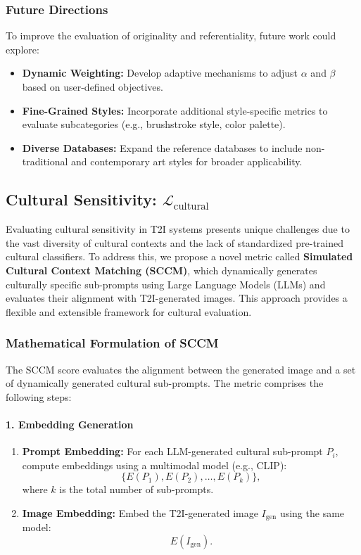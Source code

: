 \subsubsection{Future Directions}
To improve the evaluation of originality and referentiality, future work could explore:
\begin{itemize}
    \item \textbf{Dynamic Weighting:} Develop adaptive mechanisms to adjust \(\alpha\) and \(\beta\) based on user-defined objectives.
    \item \textbf{Fine-Grained Styles:} Incorporate additional style-specific metrics to evaluate subcategories (e.g., brushstroke style, color palette).
    \item \textbf{Diverse Databases:} Expand the reference databases to include non-traditional and contemporary art styles for broader applicability.
\end{itemize}


\subsection{Cultural Sensitivity: \(\mathcal{L}_{\text{cultural}}\)}
\label{subsec:cultural_sensitivity}

Evaluating cultural sensitivity in T2I systems presents unique challenges due to the vast diversity of cultural contexts and the lack of standardized pre-trained cultural classifiers. To address this, we propose a novel metric called \textbf{Simulated Cultural Context Matching (SCCM)}, which dynamically generates culturally specific sub-prompts using Large Language Models (LLMs) and evaluates their alignment with T2I-generated images. This approach provides a flexible and extensible framework for cultural evaluation.


\subsubsection{Mathematical Formulation of SCCM}
The SCCM score evaluates the alignment between the generated image and a set of dynamically generated cultural sub-prompts. The metric comprises the following steps:

\paragraph{1. Embedding Generation}
\begin{enumerate}
    \item \textbf{Prompt Embedding:} For each LLM-generated cultural sub-prompt \(P_i\), compute embeddings using a multimodal model (e.g., CLIP):
    \[
    \{E(P_1), E(P_2), \dots, E(P_k)\},
    \]
    where \(k\) is the total number of sub-prompts.
    \item \textbf{Image Embedding:} Embed the T2I-generated image \(I_{\text{gen}}\) using the same model:
    \[
    E(I_{\text{gen}}).
    \]
\end{enumerate}

